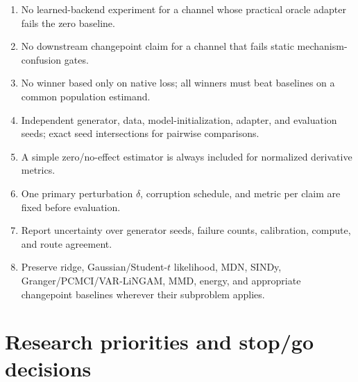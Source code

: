 \documentclass[10pt]{article}
\begin{document}
\begin{enumerate}
  \item No learned-backend experiment for a channel whose practical oracle adapter fails the zero baseline.
  \item No downstream changepoint claim for a channel that fails static mechanism-confusion gates.
  \item No winner based only on native loss; all winners must beat baselines on a common population estimand.
  \item Independent generator, data, model-initialization, adapter, and evaluation seeds; exact seed intersections for pairwise comparisons.
  \item A simple zero/no-effect estimator is always included for normalized derivative metrics.
  \item One primary perturbation \(\delta\), corruption schedule, and metric per claim are fixed before evaluation.
  \item Report uncertainty over generator seeds, failure counts, calibration, compute, and route agreement.
  \item Preserve ridge, Gaussian/Student-\(t\) likelihood, MDN, SINDy, Granger/PCMCI/VAR-LiNGAM, MMD, energy, and appropriate changepoint baselines wherever their subproblem applies.
\end{enumerate}

\section{Research priorities and stop/go decisions}
\end{document}
